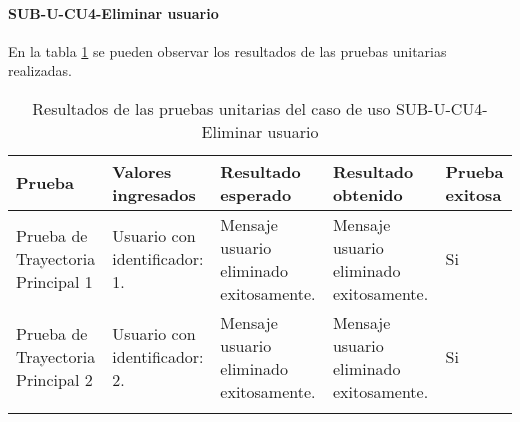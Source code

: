 \paragraph{SUB-U-CU4-Eliminar usuario}\label{SUB-U-CU4:Pruebas}
En la tabla \ref{pruebas_unitarias_sub-u-cu4} se pueden observar los resultados de las pruebas unitarias realizadas.
\begin{longtable}{|M{2cm}| M{4.5cm}|M{3cm}|M{3cm}|M{1.5cm}|}
	\hline
	\textbf{Prueba} & \textbf{Valores ingresados} & \textbf{Resultado esperado} & \textbf{Resultado obtenido} & \textbf{Prueba exitosa} \\ \hline
	Prueba de Trayectoria Principal 1 & Usuario con identificador: 1.
	& 
	Mensaje usuario eliminado exitosamente.
	&
	Mensaje usuario eliminado exitosamente.
	& Si \\ \hline

	Prueba de Trayectoria Principal 2 & Usuario con identificador: 2.
	& 
	Mensaje usuario eliminado exitosamente.
	&
	Mensaje usuario eliminado exitosamente.
	& Si \\ \hline

	\caption{Resultados de las pruebas unitarias del caso de uso SUB-U-CU4-Eliminar usuario}
	\label{pruebas_unitarias_sub-u-cu4}
\end{longtable}
